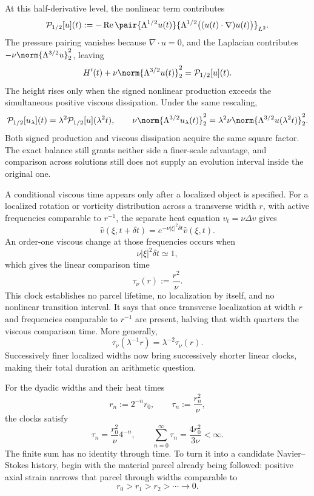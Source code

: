 
At this half-derivative level, the nonlinear term contributes
\[
  \mathcal P_{1/2}[u](t)
  :=
  -\operatorname{Re}
  \pair
    {\Lambda^{1/2}u(t)}
    {\Lambda^{1/2}\bigl((u(t)\cdot\nabla)u(t)\bigr)}_{L^2}.
\]
The pressure pairing vanishes because \(\nabla\cdot u=0\), and the Laplacian contributes \(-\nu\norm{\Lambda^{3/2}u}_2^2\), leaving
\[
  H'(t)
  +
  \nu\norm{\Lambda^{3/2}u(t)}_2^2
  =
  \mathcal P_{1/2}[u](t).
\]
The height rises only when the signed nonlinear production exceeds the simultaneous positive viscous dissipation. Under the same rescaling,
\[
  \mathcal P_{1/2}[u_\lambda](t)
  =
  \lambda^2\mathcal P_{1/2}[u](\lambda^2t),
  \qquad
  \nu\norm{\Lambda^{3/2}u_\lambda(t)}_2^2
  =
  \lambda^2\nu\norm{\Lambda^{3/2}u(\lambda^2t)}_2^2.
\]
Both signed production and viscous dissipation acquire the same square factor. The exact balance still grants neither side a finer-scale advantage, and comparison across solutions still does not supply an evolution interval inside the original one.


A conditional viscous time appears only after a localized object is specified. For a localized rotation or vorticity distribution across a transverse width \(r\), with active frequencies comparable to \(r^{-1}\), the separate heat equation \(v_t=\nu\Delta v\) gives
\[
  \widehat v(\xi,t+\delta t)
  =
  e^{-\nu|\xi|^2\delta t}\widehat v(\xi,t).
\]
An order-one viscous change at those frequencies occurs when
\[
  \nu|\xi|^2\delta t\simeq1,
\]
which gives the linear comparison time
\[
  \tau_\nu(r)
  :=
  \frac{r^2}{\nu}.
\]
This clock establishes no parcel lifetime, no localization by itself, and no nonlinear transition interval. It says that once transverse localization at width \(r\) and frequencies comparable to \(r^{-1}\) are present, halving that width quarters the viscous comparison time. More generally,
\[
  \tau_\nu(\lambda^{-1}r)
  =
  \lambda^{-2}\tau_\nu(r).
\]
Successively finer localized widths now bring successively shorter linear clocks, making their total duration an arithmetic question.


For the dyadic widths and their heat times
\[
  r_n:=2^{-n}r_0,
  \qquad
  \tau_n:=\frac{r_n^2}{\nu},
\]
the clocks satisfy
\[
  \tau_n
  =
  \frac{r_0^2}{\nu}4^{-n},
  \qquad
  \sum_{n=0}^{\infty}\tau_n
  =
  \frac{4r_0^2}{3\nu}
  <
  \infty.
\]
The finite sum has no identity through time. To turn it into a candidate Navier--Stokes history, begin with the material parcel already being followed: positive axial strain narrows that parcel through widths comparable to
\[
  r_0>r_1>r_2>\cdots\longrightarrow0.
\]

